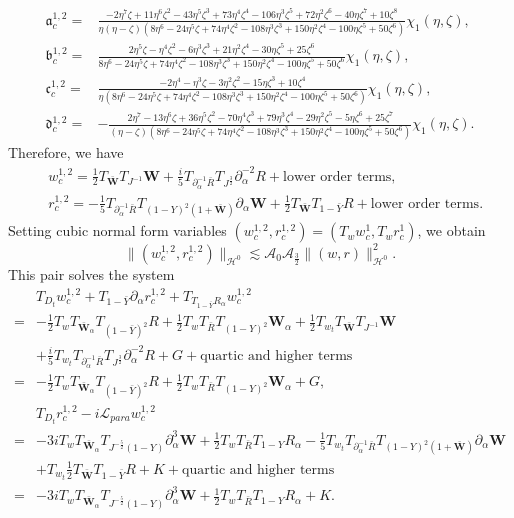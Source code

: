 \documentclass[10pt]{amsart}
\theoremstyle{remark}
\theoremstyle{definition}
\numberwithin{equation}{section}
\newcommand{\p}{\partial}
\renewcommand{\H}{{\mathcal H }}
\newcommand{\al}{\alpha}
\newcommand{\f}{\frac}
\newcommand{\bw}{\mathbf{W}}
\begin{document}
\begin{align*}
\mathfrak{a}^{1,2}_c=&\f{-2\eta^7\zeta + 11\eta^6\zeta^2-43\eta^5\zeta^3+73\eta^4\zeta^4-106\eta^3\zeta^5+72\eta^2\zeta^6-40\eta\zeta^7+10\zeta^8}{\eta(\eta - \zeta) (8\eta^6-24\eta^5\zeta+74\eta^4\zeta^2-108\eta^3\zeta^3+150\eta^2\zeta^4-100\eta\zeta^5+50\zeta^6)}\chi_{1}(\eta, \zeta),\\
\mathfrak{b}^{1,2}_c=&\f{2\eta^5\zeta -\eta^4\zeta^2-6\eta^3\zeta^3+21\eta^2\zeta^4-30\eta\zeta^5+25\zeta^6}{8\eta^6-24\eta^5\zeta+74\eta^4\zeta^2-108\eta^3\zeta^3+150\eta^2\zeta^4-100\eta\zeta^5+50\zeta^6}\chi_{1}(\eta, \zeta),\\
\mathfrak{c}^{1,2}_c=&\f{-2\eta^4 - \eta^3\zeta-3\eta^2\zeta^2-15\eta\zeta^3+10\zeta^4}{\eta(8\eta^6-24\eta^5\zeta+74\eta^4\zeta^2-108\eta^3\zeta^3+150\eta^2\zeta^4-100\eta\zeta^5+50\zeta^6)}\chi_{1}(\eta, \zeta),\\
\mathfrak{d}^{1,2}_c=&-\f{2\eta^7-13\eta^6\zeta+36\eta^5\zeta^2-70\eta^4\zeta^3+79\eta^3\zeta^4-29\eta^2\zeta^5-5\eta\zeta^6+25\zeta^7}{(\eta - \zeta)(8\eta^6-24\eta^5\zeta+74\eta^4\zeta^2-108\eta^3\zeta^3+150\eta^2\zeta^4-100\eta\zeta^5+50\zeta^6)}\chi_{1}(\eta, \zeta).
\end{align*}
Therefore, we have
\begin{align*}
    &w^{1,2}_c = \f12 T_{\bar{\bw}}T_{J^{-1}}\bw + \f{i}{5} T_{\p_\al^{-1}\bar{R}}  T_{J^{\frac{3}{2}}}  \p_\al^{-2}R + \text{lower order terms},\\
    &r^{1,2}_c = -\f15 T_{\p_\al^{-1}\bar{R}}T_{(1-Y)^2(1+\bar{\bw})}\p_\al\bw+\f12 T_{\bar{\bw}}T_{1-\bar{Y}}  R + \text{lower order terms}.
\end{align*}
Setting cubic  normal form variables $(w^{1,2}_c, r^{1,2}_c) =(T_ww^1_c, T_w r^1_c)$, we obtain
\begin{equation*}
\|(w^{1,2}_c, r^{1,2}_c)\|_{\H^0}  \lesssim\mathcal{A}_0 \mathcal{A}_\f32\|(w,r)\|^2_{\H^0}.
\end{equation*}
This pair solves the system 
\begin{align*} 
&T_{D_t}w^{1,2}_c+T_{1-\bar{Y}}\p_\al r^{1,2}_c+T_{T_{1-\bar{Y}}R_{\al}}w^{1,2}_c\\
=& -\f12 T_wT_{\bar{\bw}_\al}T_{(1-\bar{Y})^2}R+ \f12  T_wT_{\bar{R}} T_{(1-Y)^2}\bw_\al + \f12 T_{w_t}T_{\bar{\bw}}T_{J^{-1}}\bw \\
&+ \f{i}{5} T_{w_t}T_{\p_\al^{-1}\bar{R}}  T_{J^{\frac{3}{2}}}  \p_\al^{-2}R + G + \text{quartic and higher terms}\\
=& -\f12 T_wT_{\bar{\bw}_\al}T_{(1-\bar{Y})^2}R+ \f12  T_wT_{\bar{R}} T_{(1-Y)^2}\bw_\al + G,\\
&T_{D_t}r^{1,2}_c-i\mathcal{L}_{para}w^{1,2}_c \\
=&-3i  T_wT_{\bar{\bw}_\al} T_{J^{-\f52}(1-Y)}  \p_\al^3 \bw  + \f12  T_wT_{\bar{R}} T_{1-Y}R_\al -\f15 T_{w_t}T_{\p_\al^{-1}\bar{R}}T_{(1-Y)^2(1+\bar{\bw})}\p_\al\bw\\
&+T_{w_t}\f12 T_{\bar{\bw}}T_{1-\bar{Y}}  R +K+ \text{quartic and higher terms}\\
=& -3i  T_wT_{\bar{\bw}_\al} T_{J^{-\f52}(1-Y)}  \p_\al^3 \bw  + \f12  T_wT_{\bar{R}} T_{1-Y}R_\al + K.
\end{align*}
\end{document}
